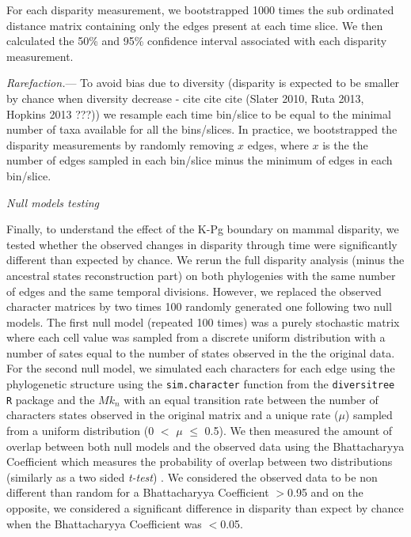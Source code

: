 \documentclass[12pt,letterpaper]{article}
\renewcommand{\subsection}[1]{%
\bigskip
\begin{center}
\begin{large}
\normalfont\itshape #1
\end{large}
\end{center}}
\renewcommand{\subsubsection}[1]{%
\vspace{2ex}
\noindent
\textit{#1.}---}
\begin{document}
For each disparity measurement, we bootstrapped 1000 times the sub ordinated distance matrix containing only the edges present at each time slice. We then calculated the 50\% and 95\% confidence interval associated with each disparity measurement.

\subsubsection{Rarefaction}
To avoid bias due to diversity (disparity is expected to be smaller by chance when diversity decrease - cite cite cite (Slater 2010, Ruta 2013, Hopkins 2013 ???)) we resample each time bin/slice to be equal to the minimal number of taxa available for all the bins/slices. In practice, we bootstrapped the disparity measurements by randomly removing $x$ edges, where $x$ is the the number of edges sampled in each bin/slice minus the minimum of edges in each bin/slice. 

\subsection{Null models testing}
Finally, to understand the effect of the K-Pg boundary on mammal disparity, we tested whether the observed changes in disparity through time were significantly different than expected by chance. We rerun the full disparity analysis (minus the ancestral states reconstruction part) on both phylogenies with the same number of edges and the same temporal divisions. However, we replaced the observed character matrices by two times 100 randomly generated one following two null models. The first null model (repeated 100 times) was a purely stochastic matrix where each cell value was sampled from a discrete uniform distribution with a number of sates equal to the number of states observed in the the original data. For the second null model, we simulated each characters for each edge using the phylogenetic structure using the \texttt{sim.character} function from the \texttt{diversitree R} package \cite{fitzjohndiversitree2012} and the $Mk_n$ \cite{lewisa2001} with an equal transition rate between the number of characters states observed in the original matrix and a unique rate ($\mu$) sampled from a uniform distribution (0 $<$ $\mu$  $\leq$ 0.5). 
We then measured the amount of overlap between both null models and the observed data using the Bhattacharyya Coefficient \cite{Bhattacharyya} which measures the probability of overlap between two distributions (similarly as a two sided \textit{t-test}) \cite{GuillermeCooper}. We considered the observed data to be non different than random for a Bhattacharyya Coefficient $>$0.95 and on the opposite, we considered a significant difference in disparity than expect by chance when the Bhattacharyya Coefficient was $<$0.05.
\end{document}
